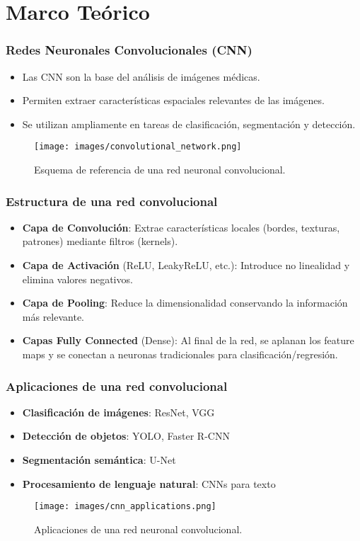 
\section{Marco Teórico}

\begin{frame}
\frametitle{Redes Neuronales Convolucionales (CNN)}
\begin{itemize}
    \item Las CNN son la base del análisis de imágenes médicas.
    \item Permiten extraer características espaciales relevantes de las imágenes.
    \item Se utilizan ampliamente en tareas de clasificación, segmentación y detección.
\end{itemize}
\begin{figure}[ht!]
    \centering
    \texttt{[image: images/convolutional\_network.png]}
    \caption{Esquema de referencia de una red neuronal convolucional.}
\end{figure}
\end{frame}

\begin{frame}
\frametitle{Estructura de una red convolucional}
\begin{itemize}
    \item \textbf{Capa de Convolución}: Extrae características locales (bordes, texturas, patrones) mediante filtros (kernels).
    \item \textbf{Capa de Activación} (ReLU, LeakyReLU, etc.): Introduce no linealidad y elimina valores negativos.
    \item \textbf{Capa de Pooling}: Reduce la dimensionalidad conservando la información más relevante.
    \item \textbf{Capas Fully Connected} (Dense): Al final de la red, se aplanan los feature maps y se conectan a neuronas tradicionales para clasificación/regresión.
\end{itemize}
\end{frame}

\begin{frame}
\frametitle{Aplicaciones de una red convolucional}
\begin{itemize}
    \item \textbf{Clasificación de imágenes}: ResNet, VGG
    \item \textbf{Detección de objetos}: YOLO, Faster R-CNN
    \item \textbf{Segmentación semántica}: U-Net
    \item \textbf{Procesamiento de lenguaje natural}: CNNs para texto
\end{itemize}
\begin{figure}[ht!]
    \centering
    \texttt{[image: images/cnn\_applications.png]}
    \caption{Aplicaciones de una red neuronal convolucional.}
\end{figure}
\end{frame}

